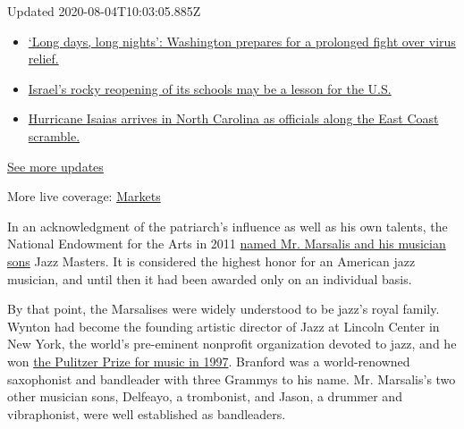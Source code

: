 Updated 2020-08-04T10:03:05.885Z

\begin{itemize}
\tightlist
\item
  \href{https://www.nytimes3xbfgragh.onion/2020/08/04/world/coronavirus-covid-19.html?action=click\&pgtype=Article\&state=default\&region=MAIN_CONTENT_1\&context=storylines_live_updates\#link-6b644638}{`Long
  days, long nights': Washington prepares for a prolonged fight over
  virus relief.}
\item
  \href{https://www.nytimes3xbfgragh.onion/2020/08/04/world/coronavirus-covid-19.html?action=click\&pgtype=Article\&state=default\&region=MAIN_CONTENT_1\&context=storylines_live_updates\#link-7af9fca0}{Israel's
  rocky reopening of its schools may be a lesson for the U.S.}
\item
  \href{https://www.nytimes3xbfgragh.onion/2020/08/04/world/coronavirus-covid-19.html?action=click\&pgtype=Article\&state=default\&region=MAIN_CONTENT_1\&context=storylines_live_updates\#link-33bf9168}{Hurricane
  Isaias arrives in North Carolina as officials along the East Coast
  scramble.}
\end{itemize}

\href{https://www.nytimes3xbfgragh.onion/2020/08/04/world/coronavirus-covid-19.html?action=click\&pgtype=Article\&state=default\&region=MAIN_CONTENT_1\&context=storylines_live_updates}{See
more updates}

More live coverage:
\href{https://www.nytimes3xbfgragh.onion/live/2020/08/04/business/stock-market-today-coronavirus?action=click\&pgtype=Article\&state=default\&region=MAIN_CONTENT_1\&context=storylines_live_updates}{Markets}

In an acknowledgment of the patriarch's influence as well as his own
talents, the National Endowment for the Arts in 2011
\href{https://www.nytimes3xbfgragh.onion/2011/01/13/arts/music/13nea.html}{named
Mr. Marsalis and his musician sons} Jazz Masters. It is considered the
highest honor for an American jazz musician, and until then it had been
awarded only on an individual basis.

By that point, the Marsalises were widely understood to be jazz's royal
family. Wynton had become the founding artistic director of Jazz at
Lincoln Center in New York, the world's pre-eminent nonprofit
organization devoted to jazz, and he won
\href{https://www.pulitzer.org/winners/wynton-marsalis}{the Pulitzer
Prize for music in 1997}. Branford was a world-renowned saxophonist and
bandleader with three Grammys to his name. Mr. Marsalis's two other
musician sons, Delfeayo, a trombonist, and Jason, a drummer and
vibraphonist, were well established as bandleaders.

